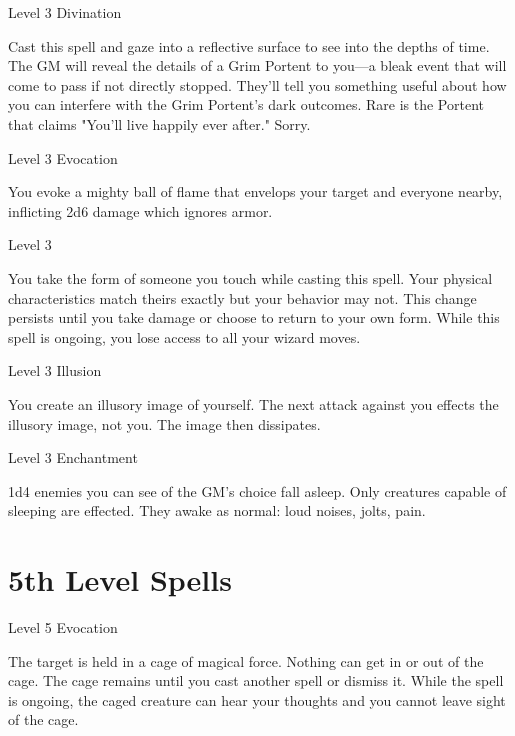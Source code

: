  
\startSpellName
{} 	Level 3	Divination
\stopSpellName
 

Cast this spell and gaze into a reflective surface to see into the depths of time. The GM will reveal the details of a Grim Portent to you—a bleak event that will come to pass if not directly stopped. They'll tell you something useful about how you can interfere with the Grim Portent's dark outcomes. Rare is the Portent that claims "You'll live happily ever after." Sorry.

 
\startSpellName
{} 	Level 3	Evocation
\stopSpellName
 

You evoke a mighty ball of flame that envelops your target and everyone nearby, inflicting 2d6 damage which ignores armor.

 
\startSpellName
{} 	Level 3
\stopSpellName
 

You take the form of someone you touch while casting this spell. Your physical characteristics match theirs exactly but your behavior may not. This change persists until you take damage or choose to return to your own form. While this spell is ongoing, you lose access to all your wizard moves.

 
\startSpellName
{} 	Level 3	Illusion
\stopSpellName
 

You create an illusory image of yourself. The next attack against you effects the illusory image, not you. The image then dissipates.

 
\startSpellName
{} 	Level 3	Enchantment
\stopSpellName
 

1d4 enemies you can see of the GM's choice fall asleep. Only creatures capable of sleeping are effected. They awake as normal: loud noises, jolts, pain.



 


\section{5th Level Spells}     
 
\startSpellName
{} 	Level 5	Evocation
\stopSpellName
 

The target is held in a cage of magical force. Nothing can get in or out of the cage. The cage remains until you cast another spell or dismiss it. While the spell is ongoing, the caged creature can hear your thoughts and you cannot leave sight of the cage.

